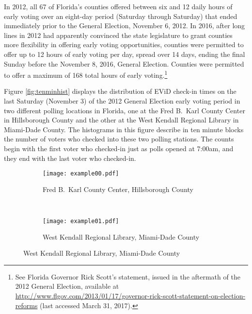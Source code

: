 \documentclass[12pt,titlepage]{article}
\begin{document}



In 2012, all 67 of Florida's counties offered between six and 12 daily
hours of early voting over an eight-day period (Saturday through
Saturday) that ended immediately prior to the General Election,
November 6, 2012.  In 2016, after long lines in 2012 had apparently
convinced the state legislature to grant counties more flexibility in
offering early voting opportunities, counties were permitted to offer
up to 12 hours of early voting per day, spread over 14 days, ending
the final Sunday before the November 8, 2016, General Election.
Counties were permitted to offer a maximum of 168 total hours of early
voting.\footnote{See Florida Governor Rick Scott's statement, issued
  in the aftermath of the 2012 General Election, available at
  \url{http://www.flgov.com/2013/01/17/governor-rick-scott-statement-on-election-reforms}
  (last accessed March 31, 2017).}

Figure \ref{fig:tenminhist} displays the distribution of EViD check-in
times on the last Saturday (November 3) of the 2012 General Election
early voting period in two different polling locations in Florida, one
at the Fred B.\ Karl County Center in Hillsborough County and the
other at the West Kendall Regional Library in Miami-Dade County.  The
histograms in this figure describe in ten minute blocks the number of
voters who checked into these two polling stations.  The counts begin
with the first voter who checked-in just as polls opened at 7:00am,
and they end with the last voter who checked-in.

\begin{figure}[!ht]
  \caption{Early voting check-in times on Saturday, November 3, 2012, in two Florida locations}
  \label{fig:tenminhist}
  \centering
  \begin{subfigure}[b]{\linewidth}
    \centering\texttt{[image: example00.pdf]}
    \caption{Fred B.\ Karl County Center, Hillsborough County}
    \label{fig:karlexample}
  \end{subfigure}%
  \\
  \begin{subfigure}[b]{\linewidth}
    \centering\texttt{[image: example01.pdf]}
    \caption{West Kendall Regional Library, Miami-Dade County}
    \label{fig:kendallexample}
  \end{subfigure}
\end{figure}
\end{document}
